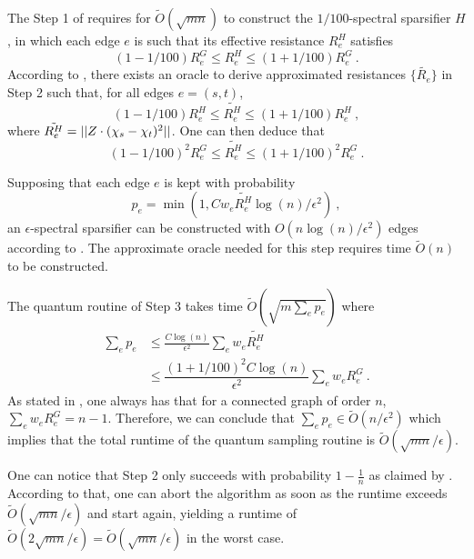 The Step 1 of  requires for
$\tilde{O}(\sqrt{mn})$ to construct the $1/100$-spectral sparsifier $H$, in which each edge $e$ is such that its effective resistance $R_e^H$ satisfies 
\begin{equation*}
        (1-1/100) R^G_e \leq R^H_e \leq (1+1/100) R^G_e\ . 
\end{equation*}
According to , there exists an oracle to derive approximated resistances $\{\tilde{R_e}\}$ in Step 2 such that, for all edges $e=(s,t)$,
\begin{equation*}
    (1-1/100) R^H_e \leq \tilde{R^H_e} \leq (1+1/100) R^H_e \ ,
\end{equation*}
where $\tilde{R^H_e} = || Z\cdot(\chi_s-\chi_t)^2 || $. One can then deduce that 
\begin{equation*}
    (1-1/100)^2 R^G_e \leq \tilde{R^H_e} \leq (1+1/100)^2 R^G_e \ . 
\end{equation*}

Supposing that each edge $e$ is kept with probability 
$$p_e = \min(1,C w_e \tilde{R^H_e} \log(n)/\epsilon^2) \ ,$$
an $\epsilon$-spectral sparsifier can be constructed with $O(n \log(n)/\epsilon^2)$ edges according to . The approximate oracle needed for this step requires time $\tilde{O}(n)$ to be constructed. %

The quantum routine of Step 3 takes time $\tilde{O}(\sqrt{m \sum_e p_e})$ where
\begin{equation*}
\begin{aligned}
    \sum_e p_e
        & \leq \frac{C \log(n)}{\epsilon^2} \sum_e w_e \tilde{R^H_e} \\
        & \leq \dfrac{(1+1/100)^2 C \log(n)}{\epsilon^2} \sum_e w_e R^G_e \ .
\end{aligned}
\end{equation*}
As stated in \cite{bollobas_modern_1998}, one always has that for a connected graph of order $n$, $\sum_e w_e R^G_e = n-1$. Therefore, we can conclude that $\sum_e p_e \in \tilde{O}(n/\epsilon^2)$ which implies that the total runtime of the quantum sampling routine is $\tilde{O}(\sqrt{mn}/\epsilon)$.

One can notice that Step 2 only succeeds with probability $1-\frac 1n$ as claimed by . According to that, one can abort the algorithm as soon as the runtime exceeds $\tilde{O}(\sqrt{mn}/\epsilon)$ and start again, yielding a runtime of $\tilde{O}(2 \sqrt{mn}/\epsilon) = \tilde{O}(\sqrt{mn}/\epsilon)$ in the worst case.\\

